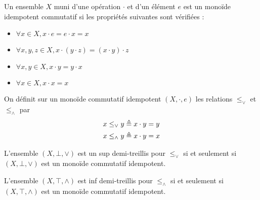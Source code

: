 \begin{definition}
  Un ensemble $X$ muni d'une opération $\cdot$ et d'un élément $e$ est un
  monoïde idempotent commutatif si les propriétés suivantes sont vérifiées :
  \begin{itemize}
  \item $\forall x\in X, x\cdot e = e \cdot x = x$
  \item $\forall x,y,z\in X, x \cdot (y \cdot z) = (x \cdot y) \cdot z$
  \item $\forall x,y\in X, x\cdot y = y \cdot x$
  \item $\forall x\in X, x\cdot x = x$
  \end{itemize}

  On définit sur un monoïde commutatif idempotent $(X,\cdot,e)$ les relations
  $\leq_\lor$ et $\leq_\land$ par
  \begin{align*}
    x \leq_\lor y &\triangleq x \cdot y = y \\
    x \leq_\land y &\triangleq x \cdot y = x
  \end{align*}
\end{definition}

\begin{proposition}
  L'ensemble $(X,\bot,\lor)$ est un sup demi-treillis pour $\leq_\lor$ si et
  seulement si $(X,\bot,\lor)$ est un monoïde commutatif idempotent.

  L'ensemble $(X,\top,\land)$ est inf demi-treillis pour $\leq_\land$ si et
  seulement si $(X,\top,\land)$ est un monoïde commutatif idempotent.
\end{proposition}

